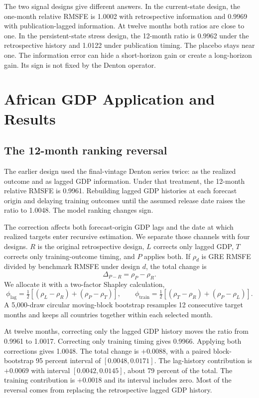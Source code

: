 \documentclass[preprint,12pt,authoryear]{elsarticle}
\begin{document}
The two signal designs give different answers. In the current-state design, the one-month relative RMSFE is 1.0002 with retrospective information and 0.9969 with publication-lagged information. At twelve months both ratios are close to one. In the persistent-state stress design, the 12-month ratio is 0.9962 under the retrospective history and 1.0122 under publication timing. The placebo stays near one. The information error can hide a short-horizon gain or create a long-horizon gain. Its sign is not fixed by the Denton operator.

\section{African GDP Application and Results}

\subsection{The 12-month ranking reversal}

The earlier design used the final-vintage Denton series twice: as the realized outcome and as lagged GDP information. Under that treatment, the 12-month relative RMSFE is 0.9961. Rebuilding lagged GDP histories at each forecast origin and delaying training outcomes until the assumed release date raises the ratio to 1.0048. The model ranking changes sign.



The correction affects both forecast-origin GDP lags and the date at which realized targets enter recursive estimation. We separate those channels with four designs. $R$ is the original retrospective design, $L$ corrects only lagged GDP, $T$ corrects only training-outcome timing, and $P$ applies both. If $\rho_d$ is GRE RMSFE divided by benchmark RMSFE under design $d$, the total change is
\[
\Delta_{P-R}=\rho_P-\rho_R.
\]
We allocate it with a two-factor Shapley calculation,
\[
\phi_{\mathrm{lag}}=\tfrac12[(\rho_L-\rho_R)+(\rho_P-\rho_T)],\qquad
\phi_{\mathrm{train}}=\tfrac12[(\rho_T-\rho_R)+(\rho_P-\rho_L)].
\]
A 5,000-draw circular moving-block bootstrap resamples 12 consecutive target months and keeps all countries together within each selected month.



At twelve months, correcting only the lagged GDP history moves the ratio from 0.9961 to 1.0017. Correcting only training timing gives 0.9966. Applying both corrections gives 1.0048. The total change is $+0.0088$, with a paired block-bootstrap 95 percent interval of $[0.0048,0.0171]$. The lag-history contribution is $+0.0069$ with interval $[0.0042,0.0145]$, about 79 percent of the total. The training contribution is $+0.0018$ and its interval includes zero. Most of the reversal comes from replacing the retrospective lagged GDP history.
\end{document}
